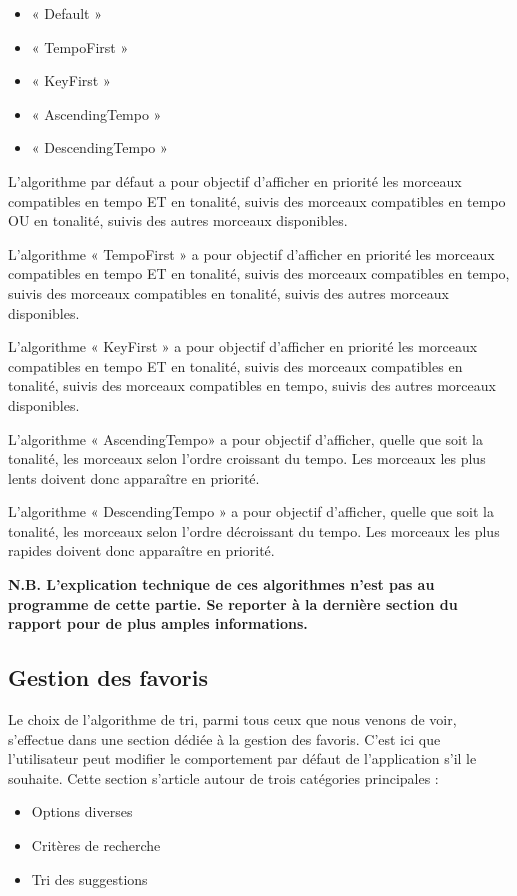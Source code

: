 \documentclass[a4paper,12pt]{article}
\begin{document}
\begin{itemize}
 \item{« Default »}
 \item{« TempoFirst »}
 \item{« KeyFirst »}
 \item{« AscendingTempo »}
 \item{« DescendingTempo »}
\end{itemize}

L'algorithme par défaut a pour objectif d'afficher en priorité les morceaux compatibles en tempo ET en tonalité, suivis des morceaux compatibles en tempo OU en tonalité, suivis des autres morceaux disponibles.

L'algorithme « TempoFirst » a pour objectif d'afficher en priorité les morceaux compatibles en tempo ET en tonalité, suivis des morceaux compatibles en tempo, suivis des morceaux compatibles en tonalité, suivis des autres morceaux disponibles.

L'algorithme « KeyFirst » a pour objectif d'afficher en priorité les morceaux compatibles en tempo ET en tonalité, suivis des morceaux compatibles en tonalité, suivis des morceaux compatibles en tempo, suivis des autres morceaux disponibles.

L'algorithme « AscendingTempo» a pour objectif d'afficher, quelle que soit la tonalité, les morceaux selon l'ordre croissant du tempo. Les morceaux les plus lents doivent donc apparaître en priorité.

L'algorithme « DescendingTempo » a pour objectif d'afficher, quelle que soit la tonalité, les morceaux selon l'ordre décroissant du tempo. Les morceaux les plus rapides doivent donc apparaître en priorité.

\textbf{N.B. L'explication technique de ces algorithmes n'est pas au programme de cette partie. Se reporter à la dernière section du rapport pour de plus amples informations.}

\subsection{Gestion des favoris}

Le choix de l'algorithme de tri, parmi tous ceux que nous venons de voir, s'effectue dans une section dédiée à la gestion des favoris. C'est ici que l'utilisateur peut modifier le comportement par défaut de l'application s'il le souhaite. Cette section s'article autour de trois catégories principales :

\begin{itemize}
 \item{Options diverses}
 \item{Critères de recherche}
 \item{Tri des suggestions}
\end{itemize}
\end{document}
